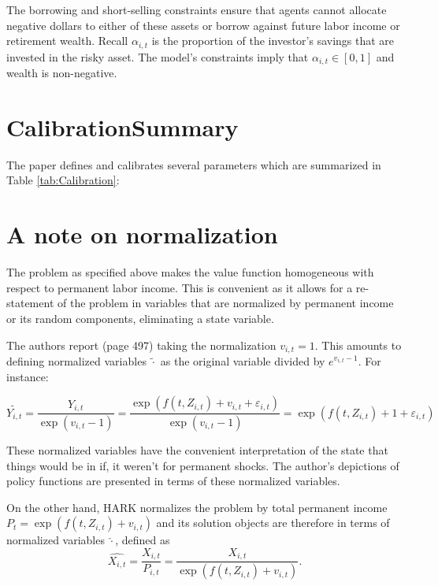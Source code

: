 \documentclass[./CGMPortfolio.tex]{subfiles}
\begin{document}
The borrowing and short-selling constraints ensure that agents cannot allocate negative dollars to either of these assets or borrow against future labor income or retirement wealth. Recall $\alpha_{i,t}$ is the proportion of the investor's savings that are invested in the risky asset. The model's constraints imply that $\alpha_{i,t}\in[0,1]$ and wealth is non-negative.

\hypertarget{Calibration}{}
\section{Calibration\textemdash Summary}

The paper defines and calibrates several parameters which are summarized in Table \ref{tab:Calibration}:



\hypertarget{Normalization}{}
\section{A note on normalization}

The problem as specified above makes the value function homogeneous with respect to permanent labor income. This is convenient as it allows for a re-statement of the problem in variables that are normalized by permanent income or its random components, eliminating a state variable.

The authors report (page 497) taking the normalization $v_{i,t} = 1$. This amounts to defining normalized variables $\tilde{\cdot}$ as the original variable divided by $e^{v_{i,t}-1}$. For instance:

\begin{equation}
\tilde{Y_{i,t}} = \frac{Y_{i,t}}{\exp(v_{i,t}-1)} = \frac{\exp (f(t,Z_{i,t}) + v_{i,t} + \varepsilon_{i,t})}{\exp(v_{i,t}-1)} = \exp( f(t,Z_{i,t}) + 1 + \varepsilon_{i,t} )
\end{equation}

These normalized variables have the convenient interpretation of the state that things would be in if, it weren't for permanent shocks. The author's depictions of policy functions are presented in terms of these normalized variables.

On the other hand, HARK normalizes the problem by total permanent income $P_t = \exp (f(t,Z_{i,t}) + v_{i,t})$ and its solution objects are therefore in terms of normalized variables $\hat{\cdot}$, defined as
\begin{equation}
\hat{X_{i,t}} = \frac{X_{i,t}}{P_{i,t}} = \frac{X_{i,t}}{\exp (f(t,Z_{i,t}) + v_{i,t})}.
\end{equation}
\end{document}
